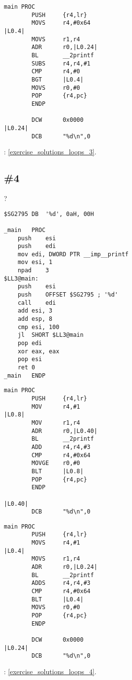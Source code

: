 \begin{lstlisting}[caption=Keil 5.03 (\ThumbMode)]
main PROC
        PUSH     {r4,lr}
        MOVS     r4,#0x64
|L0.4|
        MOVS     r1,r4
        ADR      r0,|L0.24|
        BL       __2printf
        SUBS     r4,r4,#1
        CMP      r4,#0
        BGT      |L0.4|
        MOVS     r0,#0
        POP      {r4,pc}
        ENDP

        DCW      0x0000
|L0.24|
        DCB      "%d\n",0
\end{lstlisting}

: \ref{exercise_solutions_loops_3}.

\subsection{\Exercise \#4}
\label{exercise_loops_4}

?

\begin{lstlisting}[caption=MSVC 2010 /Ox]
$SG2795	DB	'%d', 0aH, 00H

_main	PROC
	push	esi
	push	edi
	mov	edi, DWORD PTR __imp__printf
	mov	esi, 1
	npad	3
$LL3@main:
	push	esi
	push	OFFSET $SG2795 ; '%d'
	call	edi
	add	esi, 3
	add	esp, 8
	cmp	esi, 100
	jl	SHORT $LL3@main
	pop	edi
	xor	eax, eax
	pop	esi
	ret	0
_main	ENDP
\end{lstlisting}

\begin{lstlisting}[caption=Keil 5.03 (\ARMMode)]
main PROC
        PUSH     {r4,lr}
        MOV      r4,#1
|L0.8|
        MOV      r1,r4
        ADR      r0,|L0.40|
        BL       __2printf
        ADD      r4,r4,#3
        CMP      r4,#0x64
        MOVGE    r0,#0
        BLT      |L0.8|
        POP      {r4,pc}
        ENDP

|L0.40|
        DCB      "%d\n",0
\end{lstlisting}

\begin{lstlisting}[caption=Keil 5.03 (\ThumbMode)]
main PROC
        PUSH     {r4,lr}
        MOVS     r4,#1
|L0.4|
        MOVS     r1,r4
        ADR      r0,|L0.24|
        BL       __2printf
        ADDS     r4,r4,#3
        CMP      r4,#0x64
        BLT      |L0.4|
        MOVS     r0,#0
        POP      {r4,pc}
        ENDP

        DCW      0x0000
|L0.24|
        DCB      "%d\n",0
\end{lstlisting}

: \ref{exercise_solutions_loops_4}.
